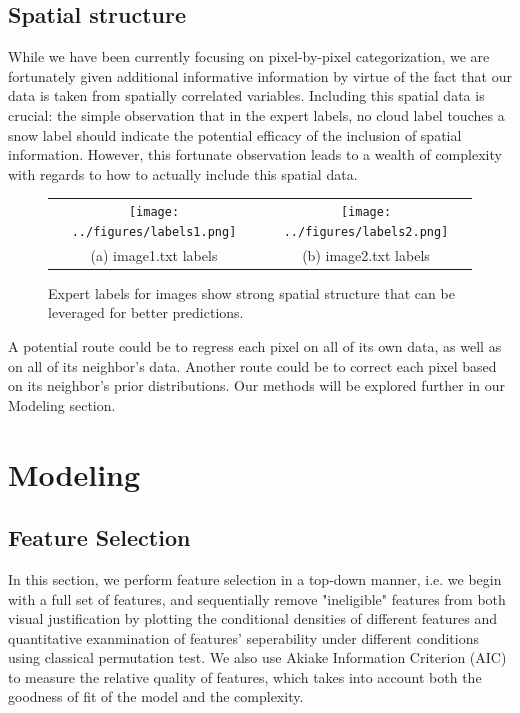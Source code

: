 \documentclass[english]{article}\usepackage{graphicx, color}
\numberwithin{equation}{section}
\numberwithin{figure}{section}
\begin{document}
\subsection{Spatial structure}
While we have been currently focusing on pixel-by-pixel categorization, we are
fortunately given additional informative information by virtue of the fact that our
data is taken from spatially correlated variables. Including this spatial data is
crucial: the simple observation that in the expert labels, no cloud label touches
a snow label should indicate the potential efficacy of the inclusion of spatial
information. However, this fortunate observation leads to a wealth of complexity
with regards to how to actually include this spatial data.


\begin{figure}[!h]
\begin{tabular}{cc}
  \texttt{[image: ../figures/labels1.png]} &
  \texttt{[image: ../figures/labels2.png]}  \\
  (a) image1.txt labels & (b) image2.txt labels
\end{tabular}
\caption{Expert labels for images show strong spatial structure that can be 
	leveraged for better predictions.}
\end{figure}


A potential route could be to regress each pixel on all of its own data, as well as
on all of its neighbor's data. Another route could be to correct each pixel based
on its neighbor's prior distributions. Our methods will be explored further in our
Modeling section.



\section{Modeling}

\subsection{Feature Selection}
In this section, we perform feature selection in a top-down manner, i.e. we begin with a full set of features, and sequentially remove "ineligible" features from both visual justification by plotting the conditional densities of different features and quantitative exanmination of features' seperability under different conditions using classical permutation test. We also use Akiake Information Criterion (AIC) to measure the relative quality of features, which takes into account both the goodness of fit of the model and the complexity.\\
\end{document}
